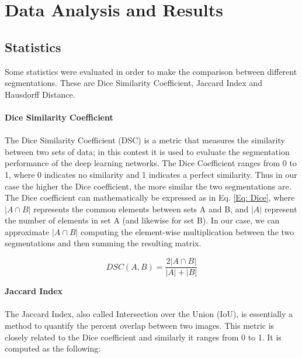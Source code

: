 \documentclass{article}
\begin{document}
	
	
	
	
	
	
	
	
	
	
	
	
	\newpage
	\section{Data Analysis and Results}

	\subsection{Statistics}
	Some statistics were evaluated in order to make the comparison between different segmentations. These are Dice Similarity Coefficient, Jaccard Index and Hausdorff Distance.
	\\
	\\
	\textbf{Dice Similarity Coefficient}
	\\
	\\
	The Dice Similarity Coefficient (DSC) is a metric that measures the similarity between two sets of data; in this contest it is used to evaluate the segmentation performance of the deep learning networks. The Dice Coefficient ranges from 0 to 1, where 0 indicates no similarity and 1 indicates a perfect similarity. Thus in our case the higher the Dice coefficient, the more similar the two segmentations are.
	\\ The Dice coefficient can mathematically be expressed as in Eq. \ref{Eq: Dice}, where $|A \cap B|$ represents the common elements between sets A and B, and $|A|$ represent the number of elements in set A (and likewise for set B). In our case, we can approximate $|A \cap B|$ computing the element-wise multiplication between the two segmentations and then summing the resulting matrix.
	
	\begin{equation}
		\label{Eq: Dice}
		DSC(A,B) = \frac{2 |A \cap B|}{|A| + |B|}
	\end{equation}
	
		
	
	
	
	\textbf{Jaccard Index}
	\\
	\\
	The Jaccard Index, also called Intersection over the Union (IoU), is essentially a method to quantify the percent overlap between two images. This metric is closely related to the Dice coefficient and similarly it ranges from 0 to 1. It is computed as the following:
	
\end{document}
